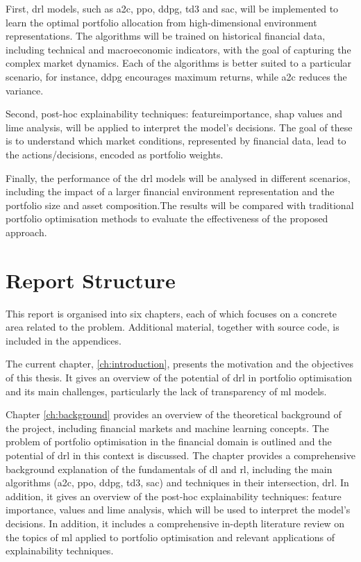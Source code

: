 First, \acrshort{drl} models, such as \acrfull{a2c}, \acrfull{ppo}, \acrfull{ddpg}, \acrfull{td3} and \acrfull{sac}, will be implemented to learn the optimal portfolio allocation from high-dimensional environment representations. The algorithms will be trained on historical financial data, including technical and macroeconomic indicators, with the goal of capturing the complex market dynamics. Each of the algorithms is better suited to a particular scenario, for instance, \acrshort{ddpg} encourages maximum returns, while \acrshort{a2c} reduces the variance.

Second, post-hoc explainability techniques: \Gls{featureimportance}, \acrfull{shap} values and \acrfull{lime} analysis, will be applied to interpret the model's decisions. The goal of these is to understand which market conditions, represented by financial data, lead to the actions/decisions, encoded as portfolio weights. 

Finally, the performance of the \acrshort{drl} models will be analysed in different scenarios, including the impact of a larger financial environment representation and the portfolio size and asset composition.The results will be compared with traditional portfolio optimisation methods to evaluate the effectiveness of the proposed approach.

\section{Report Structure} \label{sec:introduction-structure}

This report is organised into six chapters, each of which focuses on a concrete area related to the problem. Additional material, together with source code, is included in the appendices. 

The current chapter, \ref{ch:introduction}, presents the motivation and the objectives of this thesis. It gives an overview of the potential of \acrshort{drl} in portfolio optimisation and its main challenges, particularly the lack of transparency of \acrshort{ml} models. 

Chapter \ref{ch:background} provides an overview of the theoretical background of the project, including financial markets and machine learning concepts. The problem of portfolio optimisation in the financial domain is outlined and the potential of \acrshort{drl} in this context is discussed. The chapter provides a comprehensive background explanation of the fundamentals of \acrlong{dl} and \acrlong{rl}, including the main algorithms (\acrshort{a2c}, \acrshort{ppo}, \acrshort{ddpg}, \acrshort{td3}, \acrshort{sac}) and techniques in their intersection, \acrshort{drl}. In addition, it gives an overview of the post-hoc explainability techniques: feature importance,  values and \acrfull{lime} analysis, which will be used to interpret the model's decisions. In addition, it includes a comprehensive in-depth literature review on the topics of \acrshort{ml} applied to portfolio optimisation and relevant applications of explainability techniques. 

